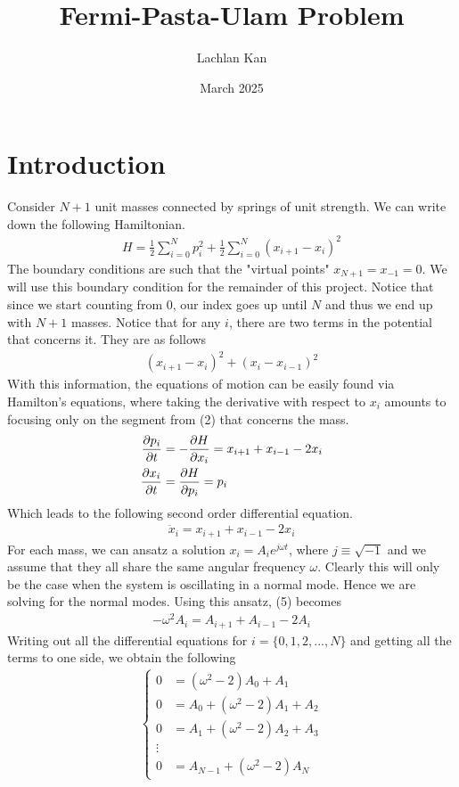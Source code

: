 \documentclass{article}
\title{Fermi-Pasta-Ulam Problem}
\author{Lachlan Kan}
\date{March 2025}
\begin{document}
\maketitle
\section{Introduction}
Consider $N+1$ unit masses connected by springs of unit strength. We can write down the following 
Hamiltonian.
\begin{align}
    H=\frac{1}{2}\sum_{i=0}^Np_i^2+\frac{1}{2}\sum_{i=0}^N(x_{i+1}-x_i)^2
\end{align}
The boundary conditions are such that the "virtual points" $x_{N+1}=x_{-1}=0$. We will use this boundary condition for the remainder of this project. Notice that since we 
start counting from 0, our index goes up until $N$ and thus we end up with $N+1$
masses. Notice that for any $i$, there are two terms in the potential that concerns 
it. They are as follows 
\begin{align}
    (x_{i+1}-x_i)^2+(x_i-x_{i-1})^2
\end{align}
With this information,
 the equations of motion can be easily found via Hamilton's equations, where taking the 
 derivative with respect to $x_i$ amounts to focusing only on the segment from (2) that concerns the mass.  
\begin{align}
    \pdv{p_i}{t}&=-\pdv{H}{x_i}=x_{i+1}+x_{i-1}-2x_i\\ 
    \pdv{x_i}{t}&=\pdv{H}{p_i}=
    p_i 
\end{align}
Which leads to the following second order differential equation. 
\begin{align}
    \ddot{x}_i=x_{i+1}+x_{i-1}-2x_i
\end{align}
For each mass, we can ansatz a solution $x_i=A_ie^{j\omega t}$, where $j\equiv\sqrt{-1}$ and we
assume that they all share the same angular frequency $\omega$. Clearly this will only be the case when the system 
is oscillating in a normal mode. Hence we are solving for the normal modes. Using this ansatz, (5) becomes 
\begin{align}
    -\omega^2 A_i= A_{i+1}+A_{i-1}-2A_i
\end{align}
Writing out all the differential equations for $i=\{0,1,2,...,N\}$ and 
getting all the terms to one side, we obtain the following 
\begin{align}
    \begin{cases}
    0&=(\omega^2-2)A_0+A_{1}\\ 
    0&=A_0+(\omega^2-2)A_1+A_2\\   
    0&=A_1+(\omega^2-2)A_2+A_3\\ 
    \vdots \\
    0&= A_{N-1} +(\omega^2-2)A_N
    \end{cases}
\end{align}
\end{document}
